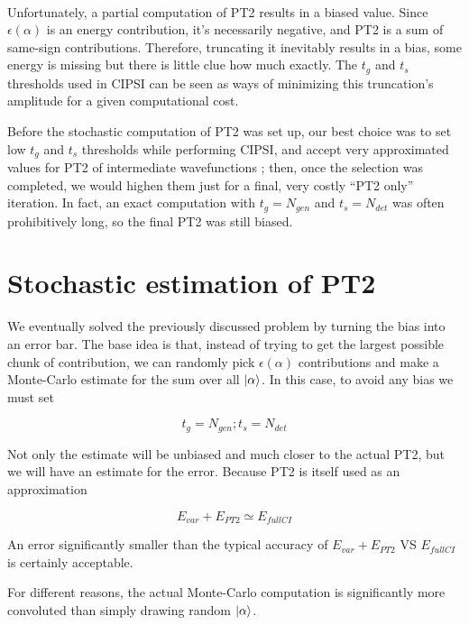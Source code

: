 \documentclass[./thesis.tex]{subfiles}
\begin{document}
\paragraph{}

Unfortunately, a partial computation of PT2 results in a biased value. Since $\epsilon(\alpha)$ is an energy contribution, it's necessarily negative, and PT2 is a sum of same-sign contributions. Therefore, truncating it inevitably results in a bias, some energy is missing but there is little clue how much exactly. The $t_g$ and $t_s$ thresholds used in CIPSI can be seen as ways of minimizing this truncation's amplitude for a given computational cost.

Before the stochastic computation of PT2 was set up, our best choice was to set low $t_g$ and $t_s$ thresholds while performing CIPSI, and accept very approximated values for PT2 of intermediate wavefunctions ; then, once the selection was completed, we would highen them just for a final, very costly ``PT2 only'' iteration. In fact, an exact computation with $t_g=N_{gen}$ and $t_s=N_{det}$ was often prohibitively long, so the final PT2 was still biased. 

\section{Stochastic estimation of PT2}

We eventually solved the previously discussed problem by turning the bias into an error bar. The base idea is that, instead of trying to get the largest possible chunk of contribution, we can randomly pick $\epsilon(\alpha)$ contributions and make a Monte-Carlo estimate for the sum over all $\ket \alpha$. In this case, to avoid any bias we must set

\begin{equation}
t_g = N_{gen} ; t_s = N_{det}
\end{equation}


Not only the estimate will be unbiased and much closer to the actual PT2, but we will have an estimate for the error. Because PT2 is itself used as an approximation

\begin{equation}
E_{var} + E_{PT2} \simeq E_{fullCI}
\end{equation}

An error significantly smaller than the typical accuracy of $E_{var} + E_{PT2}$ VS $E_{fullCI}$ is certainly acceptable.


For different reasons, the actual Monte-Carlo computation is significantly more convoluted than simply drawing random $\ket \alpha$. 
\end{document}
